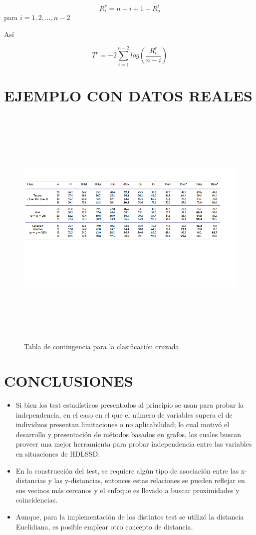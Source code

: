 \documentclass[]{book}
\begin{document}
\[R_i^{r} = n-i+1- R_o^i\] para \(i= 1, 2, ... , n-2\)

Así

\[ T^{r} = -2 \displaystyle \sum_{i=1}^{n-2} log \left( \dfrac{R_i ^r}{n-i}\right)\]

\chapter{EJEMPLO CON DATOS REALES}\label{ejemplo-con-datos-reales}

\begin{figure}
  
  {\centering \includegraphics[width=800,height=450]{invento} 
  
  }
  
  \caption{Tabla de contingencia para la clasificación cruzada}\label{fig:unnamed-chunk-11}
  \end{figure}

\chapter{CONCLUSIONES}\label{conclusiones}

\begin{itemize}
\item
  Si bien los test estadísticos presentados al principio se usan para
  probar la independencia, en el caso en el que el número de variables
  supera el de individuos presentan limitaciones o no aplicabilidad; lo
  cual motivó el desarrollo y presentación de métodos basados en grafos,
  los cuales buscan proveer una mejor herramienta para probar
  independencia entre las variables en situaciones de HDLSSD.
\item
  En la construcción del test, se requiere algún tipo de asociación
  entre las x-distancias y las y-distancias, entonces estas relaciones
  se pueden reflejar en sus vecinos más cercanos y el enfoque es llevado
  a buscar proximidades y coincidencias.
\item
  Aunque, para la implementación de los distintos test se utilizó la
  distancia Euclidiana, es posible emplear otro concepto de distancia.
\end{itemize}


\end{document}
